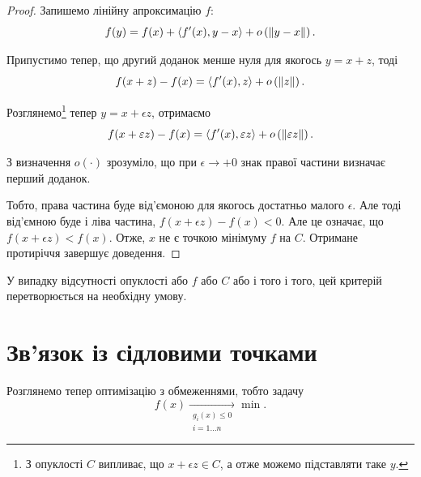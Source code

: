 \begin{proof}
    Запишемо лінійну апроксимацію $f$: 
    \begin{equation}
        f(y) = f(x) + \left\langle f'(x), y - x \right\rangle + o \left( \left\| y - x \right\| \right).
    \end{equation}
    
    Припустимо тепер, що другий доданок менше нуля для якогось $y = x + z$, тоді
    \begin{equation}
        f(x + z) - f(x) = \left\langle f'(x), z \right\rangle + o \left( \left\| z \right\| \right).
    \end{equation}

    Розглянемо\footnote{З опуклості $C$ випливає, що $x + \epsilon z \in C$, а отже можемо підставляти таке $y$.} тепер $y = x + \epsilon z$, отримаємо
    \begin{equation}
        f(x + \varepsilon z) - f(x) = \left\langle f'(x), \varepsilon z \right\rangle + o \left( \left\| \varepsilon z \right\| \right).
    \end{equation}

    З визначення $o(\cdot)$ зрозуміло, що при $\epsilon \to +0$ знак правої частини визначає перший доданок. \medskip
    
    Тобто, права частина буде від'ємоною для якогось достатньо малого $\epsilon$. Але тоді від'ємною буде і ліва частина, $f(x + \epsilon z) - f(x) < 0$. Але це означає, що $f(x + \epsilon z) < f(x)$. Отже, $x$ не є точкою мінімуму $f$ на $C$. Отримане протиріччя завершує доведення.
\end{proof}

\begin{remark}
    У випадку відсутності опуклості або $f$ або $C$ або і того і того, цей критерій перетворюється на необхідну умову.
\end{remark}


\section{Зв'язок із сідловими точками}

Розглянемо тепер оптимізацію з обмеженнями, тобто задачу
\begin{equation}
    f(x) \xrightarrow[\substack{g_i(x) \le 0 \\ i = 1 \ldots n}]{} \min.
\end{equation}

